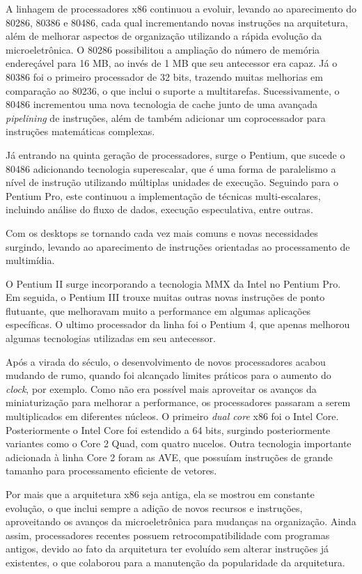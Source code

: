 \documentclass{article}
\begin{document}
A linhagem de processadores x86 continuou a evoluir, levando ao aparecimento do
80286, 80386 e 80486, cada qual incrementando novas instruções na arquitetura,
além de melhorar aspectos de organização utilizando a rápida evolução da
microeletrônica. O 80286 possibilitou a ampliação do número de memória
endereçável para 16 MB, ao invés de 1 MB que seu antecessor era capaz. Já o
80386 foi o primeiro processador de 32 bits, trazendo muitas melhorias em
comparação ao 80236, o que inclui o suporte a multitarefas. Sucessivamente, o
80486 incrementou uma nova tecnologia de cache junto de uma avançada
\textit{pipelining} de instruções, além de também adicionar um coprocessador
para instruções matemáticas complexas.

Já entrando na quinta geração de processadores, surge o Pentium, que sucede o
80486 adicionando tecnologia superescalar, que é uma forma de paralelismo a
nível de instrução utilizando múltiplas unidades de execução. Seguindo para o
Pentium Pro, este continuou a implementação de técnicas multi-escalares,
incluindo análise do fluxo de dados, execução especulativa, entre outras.

Com os desktops se tornando cada vez mais comuns e novas necessidades surgindo,
levando ao aparecimento de instruções orientadas ao processamento de multimídia.

O Pentium II surge incorporando a tecnologia MMX da Intel no Pentium Pro. Em
seguida, o Pentium III trouxe muitas outras novas instruções de ponto flutuante,
que melhoravam muito a performance em algumas aplicações específicas. O ultimo
processador da linha foi o Pentium 4, que apenas melhorou algumas tecnologias
utilizadas em seu antecessor.

Após a virada do século, o desenvolvimento de novos processadores acabou mudando
de rumo, quando foi alcançado limites práticos para o aumento do \textit{clock},
por exemplo. Como não era possível mais aproveitar os avanços da miniaturização
para melhorar a performance, os processadores passaram a serem multiplicados em
diferentes núcleos. O primeiro \textit{dual core} x86 foi o Intel Core.
Posteriormente o Intel Core foi estendido a 64 bits, surgindo posteriormente
variantes como o Core 2 Quad, com quatro nucelos. Outra tecnologia importante
adicionada à linha Core 2 foram as AVE, que possuíam instruções de grande
tamanho para processamento eficiente de vetores.

Por mais que a arquitetura x86 seja antiga, ela se mostrou em constante
evolução, o que inclui sempre a adição de novos recursos e instruções,
aproveitando os avanços da microeletrônica para mudanças na organização. Ainda
assim, processadores recentes possuem retrocompatibilidade com programas
antigos, devido ao fato da arquitetura ter evoluído sem alterar instruções já
existentes, o que colaborou para a manutenção da popularidade da arquitetura.
\end{document}
